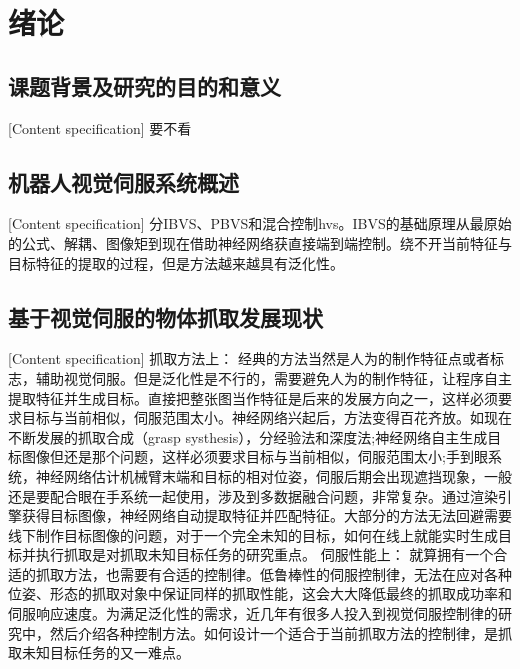 \documentclass[fontset=fandol,type=bachelor,campus=harbin]{hithesisbook}
\begin{document}
\frontmatter
\makecover
\tableofcontents %
\mainmatter
%













\chapter[绪论]{绪论}
\section{课题背景及研究的目的和意义}[Content specification]
要不看

\section{机器人视觉伺服系统概述}[Content specification]
分IBVS、PBVS和混合控制hvs。IBVS的基础原理从最原始的公式、解耦、图像矩到现在借助神经网络获直接端到端控制。绕不开当前特征与目标特征的提取的过程，但是方法越来越具有泛化性。
\section{基于视觉伺服的物体抓取发展现状}[Content specification]
抓取方法上：
经典的方法当然是人为的制作特征点或者标志，辅助视觉伺服。但是泛化性是不行的，需要避免人为的制作特征，让程序自主提取特征并生成目标。直接把整张图当作特征是后来的发展方向之一，这样必须要求目标与当前相似，伺服范围太小。神经网络兴起后，方法变得百花齐放。如现在不断发展的抓取合成（grasp systhesis），分经验法和深度法;神经网络自主生成目标图像但还是那个问题，这样必须要求目标与当前相似，伺服范围太小;手到眼系统，神经网络估计机械臂末端和目标的相对位姿，伺服后期会出现遮挡现象，一般还是要配合眼在手系统一起使用，涉及到多数据融合问题，非常复杂。通过渲染引擎获得目标图像，神经网络自动提取特征并匹配特征。大部分的方法无法回避需要线下制作目标图像的问题，对于一个完全未知的目标，如何在线上就能实时生成目标并执行抓取是对抓取未知目标任务的研究重点。
伺服性能上：
就算拥有一个合适的抓取方法，也需要有合适的控制律。低鲁棒性的伺服控制律，无法在应对各种位姿、形态的抓取对象中保证同样的抓取性能，这会大大降低最终的抓取成功率和伺服响应速度。为满足泛化性的需求，近几年有很多人投入到视觉伺服控制律的研究中，然后介绍各种控制方法。如何设计一个适合于当前抓取方法的控制律，是抓取未知目标任务的又一难点。
\end{document}

